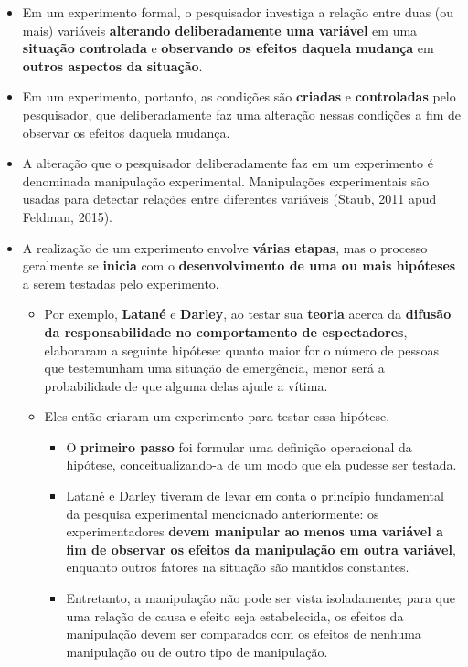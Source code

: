 \documentclass[
]{book}
\providecommand{\tightlist}{%
  \setlength{\itemsep}{0pt}\setlength{\parskip}{0pt}}
\begin{document}
\begin{itemize}
\tightlist
\item
  Em um experimento formal, o pesquisador investiga a relação entre duas (ou mais) variáveis \textbf{alterando deliberadamente uma variável} em uma \textbf{situação controlada} e \textbf{observando os efeitos daquela mudança} em \textbf{outros aspectos da situação}.
\item
  Em um experimento, portanto, as condições são \textbf{criadas} e \textbf{controladas} pelo pesquisador, que deliberadamente faz uma alteração nessas condições a fim de observar os efeitos daquela mudança.
\item
  A alteração que o pesquisador deliberadamente faz em um experimento é denominada manipulação experimental. Manipulações experimentais são usadas para detectar relações entre diferentes variáveis (Staub, 2011 apud Feldman, 2015).
\item
  A realização de um experimento envolve \textbf{várias etapas}, mas o processo geralmente se \textbf{inicia} com o \textbf{desenvolvimento de uma ou mais hipóteses} a serem testadas pelo experimento.

  \begin{itemize}
  \tightlist
  \item
    Por exemplo, \textbf{Latané} e \textbf{Darley}, ao testar sua \textbf{teoria} acerca da \textbf{difusão da responsabilidade no comportamento de espectadores}, elaboraram a seguinte hipótese: quanto maior for o número de pessoas que testemunham uma situação de emergência, menor será a probabilidade de que alguma delas ajude a vítima.
  \item
    Eles então criaram um experimento para testar essa hipótese.

    \begin{itemize}
    \tightlist
    \item
      O \textbf{primeiro passo} foi formular uma definição operacional da hipótese, conceitualizando-a de um modo que ela pudesse ser testada.
    \item
      Latané e Darley tiveram de levar em conta o princípio fundamental da pesquisa experimental mencionado anteriormente: os experimentadores \textbf{devem manipular ao menos uma variável a fim de observar os efeitos da manipulação em outra variável}, enquanto outros fatores na situação são mantidos constantes.
    \item
      Entretanto, a manipulação não pode ser vista isoladamente; para que uma relação de causa e efeito seja estabelecida, os efeitos da manipulação devem ser comparados com os efeitos de nenhuma manipulação ou de outro tipo de manipulação.
    \end{itemize}
  \end{itemize}
\end{itemize}
\end{document}
